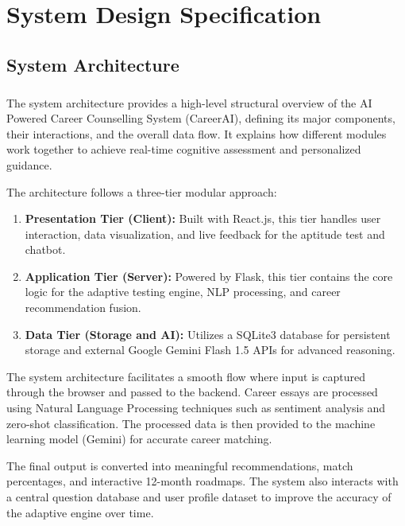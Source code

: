 \chapter{System Design Specification} 
\section{System Architecture}
\paragraph{}
The system architecture provides a high-level structural overview of the AI Powered Career Counselling System (CareerAI), defining its major components, their interactions, and the overall data flow. It explains how different modules work together to achieve real-time cognitive assessment and personalized guidance.

The architecture follows a three-tier modular approach:
\begin{enumerate}
    \item \textbf{Presentation Tier (Client):} Built with React.js, this tier handles user interaction, data visualization, and live feedback for the aptitude test and chatbot.
    \item \textbf{Application Tier (Server):} Powered by Flask, this tier contains the core logic for the adaptive testing engine, NLP processing, and career recommendation fusion.
    \item \textbf{Data Tier (Storage and AI):} Utilizes a SQLite3 database for persistent storage and external Google Gemini Flash 1.5 APIs for advanced reasoning.
\end{enumerate}

The system architecture facilitates a smooth flow where input is captured through the browser and passed to the backend. Career essays are processed using Natural Language Processing techniques such as sentiment analysis and zero-shot classification. The processed data is then provided to the machine learning model (Gemini) for accurate career matching.

The final output is converted into meaningful recommendations, match percentages, and interactive 12-month roadmaps. The system also interacts with a central question database and user profile dataset to improve the accuracy of the adaptive engine over time.


